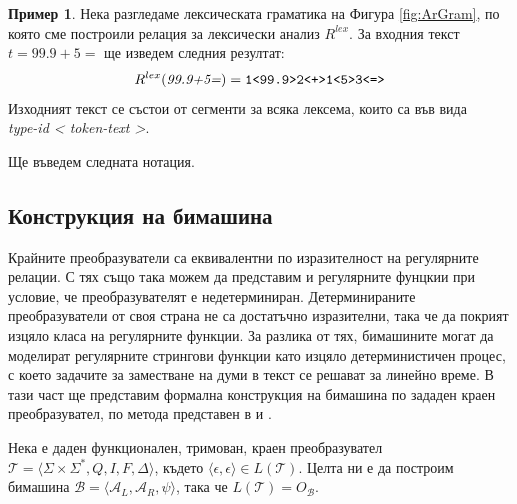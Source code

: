 \documentclass[12pt, oneside]{article}
\theoremstyle{definition}
\newtheorem{example}{Пример}[section]
\begin{document}
\begin{example}
	Нека разгледаме лексическата граматика на Фигура \ref{fig:ArGram}, по която сме построили релация за лексически анализ \(R^{lex}\). За входния текст \(t = 99.9+5= \) ще изведем следния резултат:
	\[ R^{lex}(\emph{99.9+5=}) = \verb/1<99.9>2<+>1<5>3<=>/ \]
	Изходният текст се състои от сегменти за всяка лексема, които са във вида \\ \emph{type-id < token-text >}.
\end{example}


Ще въведем следната нотация.

\subsection{Конструкция на бимашина}
\label{sec:BmConstruct}
Крайните преобразуватели са еквивалентни по изразителност на регулярните релации. С тях също така можем да представим и регулярните фунцкии при условие, че преобразувателят е недетерминиран. Детерминираните преобразуватели от своя страна не са достатъчно изразителни, така че да покрият изцяло класа на регулярните функции. За разлика от тях, бимашините могат да моделират регулярните стрингови функции \cite{Schutzenberger:61} като изцяло детерминистичен процес, с което задачите за заместване на думи в текст се решават за линейно време. В тази част ще представим формална конструкция на бимашина по зададен краен преобразувател, по метода представен в \cite{GerdjikovEtAl:2017} и \cite{Mihov:2018-2}.

Нека е даден функционален, тримован, краен преобразувател \( \mathcal{T} = \langle \Sigma \times \Sigma^*, Q, I, F, \Delta \rangle \), където \( \langle \epsilon, \epsilon \rangle \in L(\mathcal{T}) \). Целта ни е да построим бимашина \( \mathcal{B} = \langle \mathcal{A}_L, \mathcal{A}_R, \psi \rangle \), така че \( L(\mathcal{T}) = O_\mathcal{B} \).
\end{document}
